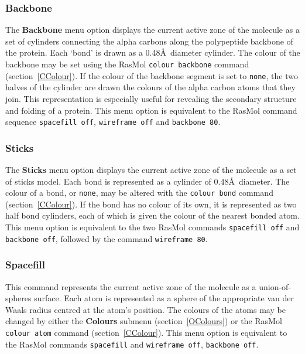 \subsubsection{Backbone}
\label{OBackbone}
The {\bf Backbone} menu option displays the current active zone of the
molecule as a set of cylinders connecting the alpha carbons along the
polypeptide backbone of the protein. Each `bond' is drawn as a 0.48\AA\
diameter cylinder. The colour of the backbone may be set using the RasMol
{\tt colour backbone} command (section~\ref{CColour}). If the colour of
the backbone segment is set to {\tt none}, the two halves of the cylinder
are drawn the colours of the alpha carbon atoms that they join. This 
representation is especially useful for revealing the secondary structure and
folding of a protein. This menu option is equivalent to the RasMol command 
sequence {\tt spacefill off}, {\tt wireframe off} and {\tt backbone 80}.


\subsubsection{Sticks}
\label{OSticks}
The {\bf Sticks} menu option displays the current active zone of the 
molecule as a set of sticks model. Each bond is represented as a cylinder
of 0.48\AA\ diameter. The colour of a bond, or {\tt none}, may be altered 
with the {\tt colour bond} command (section~\ref{CColour}). If the bond 
has no colour of its own, it is represented as two half bond cylinders, 
each of which is given the colour of the nearest bonded atom. This menu 
option is equivalent to the two RasMol commands {\tt spacefill off} and 
{\tt backbone off}, followed by the command {\tt wireframe 80}.

\subsubsection{Spacefill}
\label{OSpacefill}
This command represents the current active zone of the molecule as a 
union-of-spheres surface. Each atom is represented as a sphere of the
appropriate van der Waals radius centred at the atom's position. The
colours of the atoms may be changed by either the {\bf Colours} submenu
(section~\ref{OColours}) or the RasMol {\tt colour atom} command 
(section~\ref{CColour}). This menu option is equivalent to the RasMol 
commands {\tt spacefill} and {\tt wireframe off}, {\tt backbone off}.
\index{Van der Waals radius}


